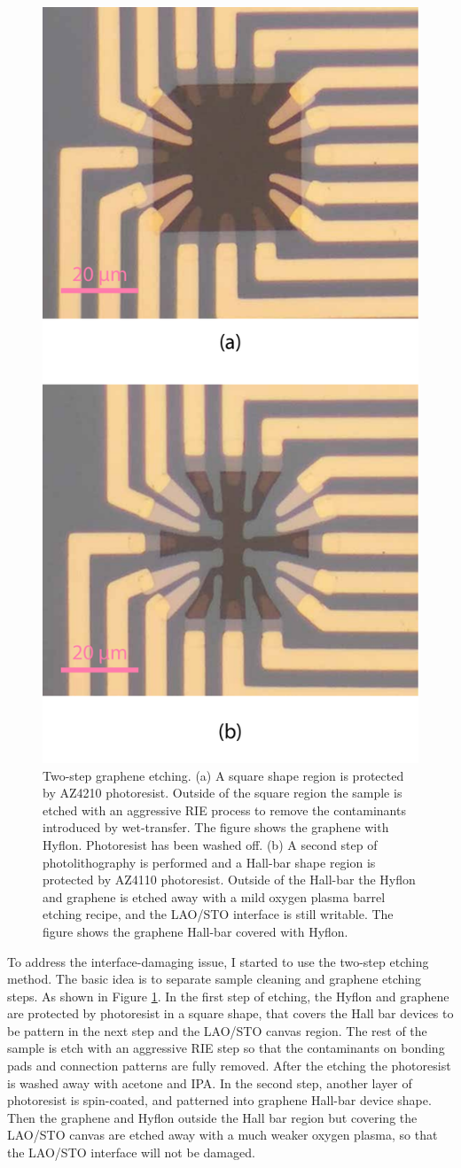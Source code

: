 \documentclass[pdflatex, sectionletters, 12pt]{pittetd}    %
\begin{document}
\begin{figure}[p]
	\centering
	\includegraphics[width=.5\textwidth]{Drawing/RIETwoStep.pdf}
	\caption{Two-step graphene etching. (a) A square shape region is protected by AZ4210 photoresist. Outside of the square region the sample is etched with an aggressive RIE process to remove the contaminants introduced by wet-transfer. The figure shows the graphene with Hyflon. Photoresist has been washed off. (b) A second step of photolithography is performed and a Hall-bar shape region is protected by AZ4110 photoresist. Outside of the Hall-bar the Hyflon and graphene is etched away with a mild oxygen plasma barrel etching recipe, and the LAO/STO interface is still writable. The figure shows the graphene Hall-bar covered with Hyflon. }
	\label{FIG:RIETwoStep}
\end{figure}

To address the interface-damaging issue, I started to use the two-step etching method. The basic idea is to separate sample cleaning and graphene etching steps. As shown in Figure \ref{FIG:RIETwoStep}. In the first step of etching, the Hyflon and graphene are protected by photoresist in a square shape, that covers the Hall bar devices to be pattern in the next step and the LAO/STO canvas region. The rest of the sample is etch with an aggressive RIE step so that the contaminants on bonding pads and connection patterns are fully removed. After the etching the photoresist is washed away with acetone and IPA. In the second step, another layer of photoresist is spin-coated, and patterned into graphene Hall-bar device shape. Then the graphene and Hyflon outside the Hall bar region but covering the LAO/STO canvas are etched away with a much weaker oxygen plasma, so that the LAO/STO interface will not be damaged.
\end{document}
